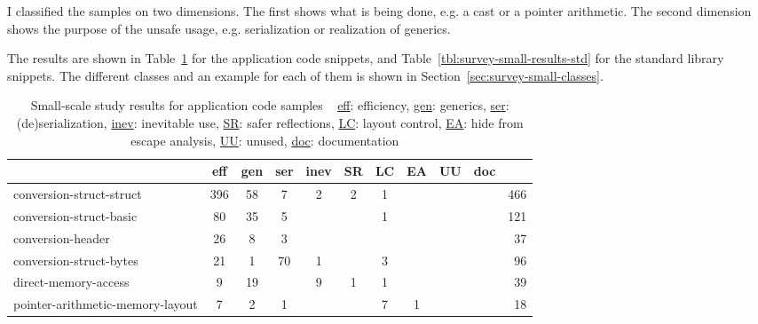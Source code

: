 I classified the samples on two dimensions.
The first shows what is being done, e.g. a cast or a pointer arithmetic.
The second dimension shows the purpose of the unsafe usage, e.g. serialization or realization of generics.

The results are shown in Table~\ref{tbl:survey-small-results-app} for the application code snippets, and
Table~\ref{tbl:survey-small-results-std} for the standard library snippets.
The different classes and an example for each of them is shown in Section~\ref{sec:survey-small-classes}.

\begin{table}[h]
    \centering
    \caption[Small-scale study results for application code samples]%
    {Small-scale study results for application code samples \newline \tiny ~ \newline \small
        \underline{eff}: efficiency, \underline{gen}: generics, \underline{ser}: (de)serialization,
        \underline{inev}: inevitable use, \underline{SR}: safer reflections, \underline{LC}: layout control,
        \underline{EA}: hide from escape analysis, \underline{UU}: unused,
        \underline{doc}: documentation \newline \tiny ~}
    \label{tbl:survey-small-results-app}
    \begin{tabularx}{\textwidth}{Xccccccccc|r}
        \toprule
                                          &  eff &  gen & ser & inev &  SR &  LC &  EA &  UU & doc &  {}   \\
        \midrule
                 conversion-struct-struct &  396 &   58 &   7 &    2 &   2 &   1 &    &     &     &   466 \\
        \rowcolor{verylightgray}
                  conversion-struct-basic &   80 &   35 &   5 &      &     &   1 &    &     &     &   121 \\
                        conversion-header &   26 &    8 &   3 &      &     &     &    &     &     &    37 \\
        \rowcolor{verylightgray}
                  conversion-struct-bytes &   21 &    1 &  70 &    1 &     &   3 &    &     &     &    96 \\
                     direct-memory-access &    9 &   19 &     &    9 &   1 &   1 &    &     &     &    39 \\
        \rowcolor{verylightgray}
         pointer-arithmetic-memory-layout &    7 &    2 &   1 &      &     &   7 &  1 &     &     &    18 \\

\end{tabularx}
\end{table}
